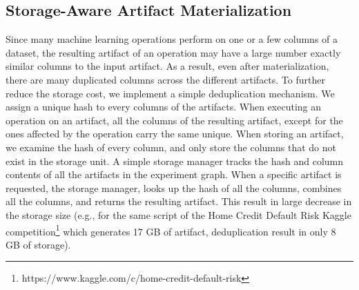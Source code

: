 \subsection{Storage-Aware Artifact Materialization}
Since many machine learning operations perform on one or a few columns of a dataset, the resulting artifact of an operation may have a large number exactly similar columns to the input artifact.
As a result, even after materialization, there are many duplicated columns across the different artifacts.
To further reduce the storage cost, we implement a simple deduplication mechanism.
We assign a unique hash to every columns of the artifacts.
When executing an operation on an artifact, all the columns of the resulting artifact, except for the ones affected by the operation carry the same unique.
When storing an artifact, we examine the hash of every column, and only store the columns that do not exist in the storage unit.
A simple storage manager tracks the hash and column contents of all the artifacts in the experiment graph.
When a specific artifact is requested, the storage manager, looks up the hash of all the columns, combines all the columns, and returns the resulting artifact.
This result in large decrease in the storage size (e.g., for the same script of the Home Credit Default Risk Kaggle competition\footnote{https://www.kaggle.com/c/home-credit-default-risk} which generates 17 GB of artifact, deduplication result in only 8 GB of storage).

